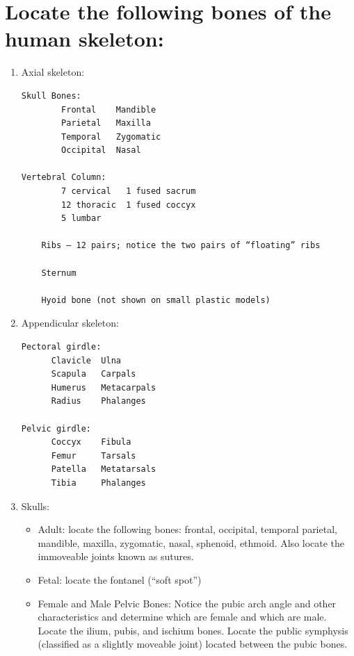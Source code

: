\documentclass[]{book}
\theoremstyle{definition}
\theoremstyle{definition}
\theoremstyle{definition}
\theoremstyle{remark}
\begin{document}
\section{Locate the following bones of the human
skeleton:}\label{locate-the-following-bones-of-the-human-skeleton}

\begin{enumerate}
\def\labelenumi{\arabic{enumi}.}
\item
  Axial skeleton:

\begin{verbatim}
Skull Bones:
        Frontal    Mandible
        Parietal   Maxilla
        Temporal   Zygomatic
        Occipital  Nasal

Vertebral Column:
        7 cervical   1 fused sacrum
        12 thoracic  1 fused coccyx
        5 lumbar

    Ribs – 12 pairs; notice the two pairs of “floating” ribs

    Sternum

    Hyoid bone (not shown on small plastic models)
\end{verbatim}
\item
  Appendicular skeleton:

\begin{verbatim}
Pectoral girdle:
      Clavicle  Ulna
      Scapula   Carpals
      Humerus   Metacarpals
      Radius    Phalanges

Pelvic girdle:
      Coccyx    Fibula
      Femur     Tarsals
      Patella   Metatarsals
      Tibia     Phalanges
\end{verbatim}
\item
  Skulls:

  \begin{itemize}
  \item
    Adult: locate the following bones: frontal, occipital, temporal
    parietal, mandible, maxilla, zygomatic, nasal, sphenoid, ethmoid.
    Also locate the immoveable joints known as sutures.
  \item
    Fetal: locate the fontanel (``soft spot'')
  \item
    Female and Male Pelvic Bones: Notice the pubic arch angle and other
    characteristics and determine which are female and which are male.
    Locate the ilium, pubis, and ischium bones. Locate the public
    symphysis (classified as a slightly moveable joint) located between
    the pubic bones.
  \end{itemize}
\end{enumerate}
\end{document}
